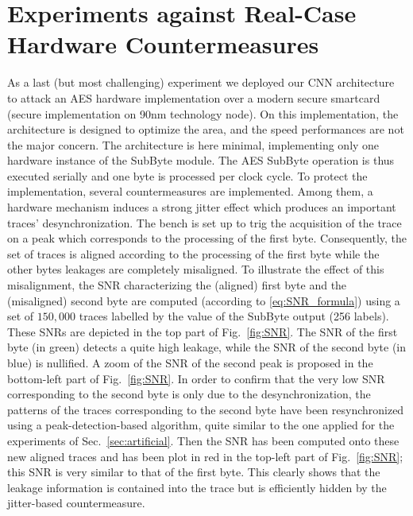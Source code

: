 \section{Experiments against Real-Case Hardware Countermeasures}\label{sec:AES}
As a last (but most challenging) experiment we deployed our CNN architecture to attack an AES hardware implementation over a modern secure smartcard (secure implementation on 90nm technology node). On this implementation, the architecture is designed to optimize the area, and the speed performances are not the major concern. The architecture is here minimal, implementing only one hardware instance of the SubByte module.  The AES SubByte operation is thus executed serially and one byte is processed per clock cycle. To protect the implementation, several countermeasures are implemented.  Among them, a hardware mechanism induces a strong jitter effect which produces an important traces' desynchronization. The bench is set up to trig the acquisition of the trace on a peak which corresponds to the processing of the first byte. Consequently, the set of traces is aligned according to the processing of the first byte while the other bytes leakages are completely misaligned. To illustrate the effect of this misalignment, the SNR characterizing the (aligned) first byte and the (misaligned) second byte are computed (according to \eqref{eq:SNR_formula}) using a set of $150,000$ traces labelled by the value of the SubByte output (256 labels). These SNRs are depicted in the top part of Fig.~\ref{fig:SNR}. The SNR of the first byte (in green) detects a quite high leakage, while the SNR of the second byte (in blue) is nullified. A zoom of the SNR of the second peak is proposed in the bottom-left part of Fig.~\ref{fig:SNR}. In order to confirm that the very low SNR corresponding to the second byte is only due to the desynchronization, the patterns of the traces corresponding to the second byte have been resynchronized using a peak-detection-based algorithm, quite similar to the one applied for the experiments of Sec.~\ref{sec:artificial}. Then the SNR has been computed onto these new aligned traces and has been plot in red in the top-left part of Fig.~\ref{fig:SNR}; this SNR is very similar to that of the first byte. This clearly shows that the leakage information is contained into the trace but is efficiently hidden by the jitter-based countermeasure. 

